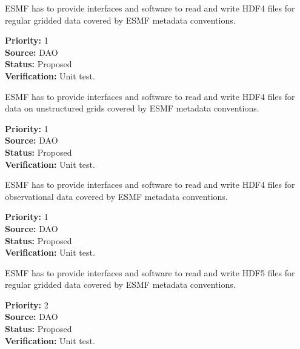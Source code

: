
ESMF has to provide interfaces and software to read and write HDF4 files for 
regular gridded data covered by ESMF metadata conventions.
 

\begin{reqlist}
{\bf Priority:} 1 \\
{\bf Source:} DAO \\
{\bf Status:} Proposed \\
{\bf Verification:} Unit test. \\
\end{reqlist}




ESMF has to provide interfaces and software to read and write HDF4
files for data on unstructured grids covered by ESMF metadata conventions.
 

\begin{reqlist}
{\bf Priority:} 1 \\
{\bf Source:} DAO \\
{\bf Status:} Proposed \\
{\bf Verification:} Unit test. \\
\end{reqlist}


ESMF has to provide interfaces and software to read and write HDF4
files for observational data  covered by ESMF metadata conventions.
 

\begin{reqlist}
{\bf Priority:} 1 \\
{\bf Source:} DAO \\
{\bf Status:} Proposed \\
{\bf Verification:} Unit test. \\
\end{reqlist}


ESMF has to provide interfaces and software to read and write HDF5
files for regular gridded data covered by ESMF metadata conventions.

\begin{reqlist}
{\bf Priority:} 2 \\
{\bf Source:} DAO \\
{\bf Status:} Proposed \\
{\bf Verification:} Unit test. 
\end{reqlist}



